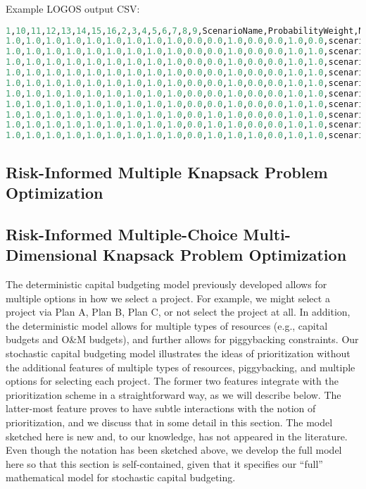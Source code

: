 Example LOGOS output CSV:
\begin{lstlisting}[basicstyle=\tiny,language=python]
1,10,11,12,13,14,15,16,2,3,4,5,6,7,8,9,ScenarioName,ProbabilityWeight,MaxNPV
1.0,1.0,1.0,1.0,1.0,1.0,1.0,1.0,1.0,0.0,0.0,1.0,0.0,0.0,1.0,0.0,scenario_1,0.012,-23.581
1.0,1.0,1.0,1.0,1.0,1.0,1.0,1.0,1.0,0.0,0.0,1.0,0.0,0.0,1.0,1.0,scenario_2,0.019,-23.459
1.0,1.0,1.0,1.0,1.0,1.0,1.0,1.0,1.0,0.0,0.0,1.0,0.0,0.0,1.0,1.0,scenario_3,0.032,-23.459
1.0,1.0,1.0,1.0,1.0,1.0,1.0,1.0,1.0,0.0,0.0,1.0,0.0,0.0,1.0,1.0,scenario_4,0.052,-23.459
1.0,1.0,1.0,1.0,1.0,1.0,1.0,1.0,1.0,0.0,0.0,1.0,0.0,0.0,1.0,1.0,scenario_5,0.086,-23.459
1.0,1.0,1.0,1.0,1.0,1.0,1.0,1.0,1.0,0.0,0.0,1.0,0.0,0.0,1.0,1.0,scenario_6,0.142,-23.459
1.0,1.0,1.0,1.0,1.0,1.0,1.0,1.0,1.0,0.0,0.0,1.0,0.0,0.0,1.0,1.0,scenario_7,0.235,-23.459
1.0,1.0,1.0,1.0,1.0,1.0,1.0,1.0,1.0,0.0,1.0,1.0,0.0,0.0,1.0,1.0,scenario_8,0.188,37.130
1.0,1.0,1.0,1.0,1.0,1.0,1.0,1.0,1.0,0.0,1.0,1.0,0.0,0.0,1.0,1.0,scenario_9,0.141,37.1230
1.0,1.0,1.0,1.0,1.0,1.0,1.0,1.0,1.0,0.0,1.0,1.0,1.0,0.0,1.0,1.0,scenario_10,0.093,42.303
\end{lstlisting}

\subsection{Risk-Informed Multiple Knapsack Problem Optimization}
\label{subsec:RImkp}


\subsection{Risk-Informed Multiple-Choice Multi-Dimensional Knapsack Problem Optimization}
\label{subsec:RImckp}














The deterministic capital budgeting model previously developed allows for multiple options in how
we select a project. For example, we might select a project via Plan A, Plan B, Plan C, or not
select the project at all. In addition, the deterministic model allows for multiple types of
resources (e.g., capital budgets and O\&M budgets), and further allows for piggybacking constraints.
Our stochastic capital budgeting model illustrates the ideas of prioritization without the
additional features of multiple types of resources, piggybacking, and multiple options for selecting
each project.  The former two features integrate with the prioritization scheme in a straightforward
way, as we will describe below. The latter-most feature proves to have subtle interactions with
the notion of prioritization, and we discuss that in some detail in this section. The model
sketched here is new and, to our knowledge, has not appeared in the literature. Even though the
notation has been sketched above, we develop the full model here so that this section is
self-contained, given that it specifies our “full” mathematical model for stochastic capital
budgeting.



